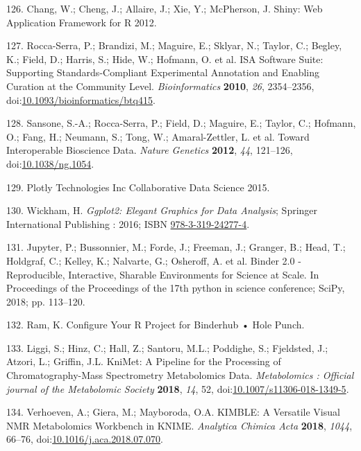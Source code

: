 \documentclass[]{article}
\begin{document}
\leavevmode\hypertarget{ref-chang_website_2012}{}%
126. Chang, W.; Cheng, J.; Allaire, J.; Xie, Y.; McPherson, J. Shiny: Web Application Framework for R 2012.

\leavevmode\hypertarget{ref-roccaserra_2010}{}%
127. Rocca-Serra, P.; Brandizi, M.; Maguire, E.; Sklyar, N.; Taylor, C.; Begley, K.; Field, D.; Harris, S.; Hide, W.; Hofmann, O. et al. ISA Software Suite: Supporting Standards-Compliant Experimental Annotation and Enabling Curation at the Community Level. \emph{Bioinformatics} \textbf{2010}, \emph{26}, 2354--2356, doi:\href{https://doi.org/10.1093/bioinformatics/btq415}{10.1093/bioinformatics/btq415}.

\leavevmode\hypertarget{ref-sansone_2012}{}%
128. Sansone, S.-A.; Rocca-Serra, P.; Field, D.; Maguire, E.; Taylor, C.; Hofmann, O.; Fang, H.; Neumann, S.; Tong, W.; Amaral-Zettler, L. et al. Toward Interoperable Bioscience Data. \emph{Nature Genetics} \textbf{2012}, \emph{44}, 121--126, doi:\href{https://doi.org/10.1038/ng.1054}{10.1038/ng.1054}.

\leavevmode\hypertarget{ref-plotlytechnologiesinc_website_2015}{}%
129. Plotly Technologies Inc Collaborative Data Science 2015.

\leavevmode\hypertarget{ref-wickham_2016}{}%
130. Wickham, H. \emph{Ggplot2: Elegant Graphics for Data Analysis}; Springer International Publishing : 2016; ISBN \href{https://worldcat.org/isbn/978-3-319-24277-4}{978-3-319-24277-4}.

\leavevmode\hypertarget{ref-jupyter_2018}{}%
131. Jupyter, P.; Bussonnier, M.; Forde, J.; Freeman, J.; Granger, B.; Head, T.; Holdgraf, C.; Kelley, K.; Nalvarte, G.; Osheroff, A. et al. Binder 2.0 - Reproducible, Interactive, Sharable Environments for Science at Scale. In Proceedings of the Proceedings of the 17th python in science conference; SciPy, 2018; pp. 113--120.

\leavevmode\hypertarget{ref-ram_website_nd}{}%
132. Ram, K. Configure Your R Project for Binderhub • Hole Punch.

\leavevmode\hypertarget{ref-liggi_2018}{}%
133. Liggi, S.; Hinz, C.; Hall, Z.; Santoru, M.L.; Poddighe, S.; Fjeldsted, J.; Atzori, L.; Griffin, J.L. KniMet: A Pipeline for the Processing of Chromatography-Mass Spectrometry Metabolomics Data. \emph{Metabolomics : Official journal of the Metabolomic Society} \textbf{2018}, \emph{14}, 52, doi:\href{https://doi.org/10.1007/s11306-018-1349-5}{10.1007/s11306-018-1349-5}.

\leavevmode\hypertarget{ref-verhoeven_2018}{}%
134. Verhoeven, A.; Giera, M.; Mayboroda, O.A. KIMBLE: A Versatile Visual NMR Metabolomics Workbench in KNIME. \emph{Analytica Chimica Acta} \textbf{2018}, \emph{1044}, 66--76, doi:\href{https://doi.org/10.1016/j.aca.2018.07.070}{10.1016/j.aca.2018.07.070}.
\end{document}
